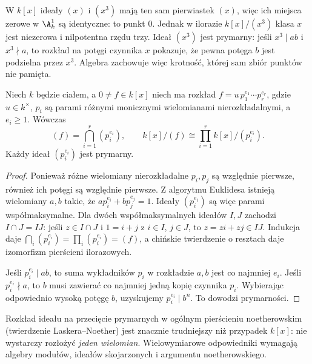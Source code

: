\begin{przyklad}
W $k[x]$ ideały $(x)$ i $(x^3)$ mają ten sam
pierwiastek $(x)$, więc ich miejsca zerowe
w $\A^1_k$ są identyczne: to punkt $0$.
Jednak w ilorazie $k[x]/(x^3)$ klasa $x$
jest niezerowa i nilpotentna rzędu trzy.
Ideał $(x^3)$ jest prymarny: jeśli $x^3\mid ab$
i $x^3\nmid a$, to rozkład na potęgi czynnika
$x$ pokazuje, że pewna potęga $b$ jest podzielna
przez $x^3$. Algebra zachowuje więc krotność,
której sam zbiór punktów nie pamięta.
\end{przyklad}

\begin{twierdzenie}
\label{tw:primary-kx}
Niech $k$ będzie ciałem, a $0\ne f\in k[x]$
niech ma rozkład
$f=u\,p_1^{e_1}\cdots p_r^{e_r}$,
gdzie $u\in k^\times$, $p_i$ są parami
różnymi monicznymi wielomianami nierozkładalnymi,
a $e_i\ge1$. Wówczas
\[
 (f)=\bigcap_{i=1}^r(p_i^{e_i}),\qquad
 k[x]/(f)\cong\prod_{i=1}^r k[x]/(p_i^{e_i}).
\]
Każdy ideał $(p_i^{e_i})$ jest prymarny.
\end{twierdzenie}
\begin{proof}
Ponieważ różne wielomiany nierozkładalne $p_i,p_j$
są względnie pierwsze, również ich potęgi są
względnie pierwsze. Z algorytmu Euklidesa
istnieją wielomiany $a,b$ takie, że
$ap_i^{e_i}+bp_j^{e_j}=1$.
Ideały $(p_i^{e_i})$ są więc parami współmaksymalne.
Dla dwóch współmaksymalnych ideałów $I,J$
zachodzi $I\cap J=IJ$: jeśli $z\in I\cap J$
i $1=i+j$ z $i\in I$, $j\in J$, to
$z=zi+zj\in IJ$. Indukcja daje
$\bigcap_i(p_i^{e_i})=\prod_i(p_i^{e_i})=(f)$,
a chińskie twierdzenie o resztach daje izomorfizm
pierścieni ilorazowych.

Jeśli $p_i^{e_i}\mid ab$, to suma wykładników
$p_i$ w rozkładzie $a,b$ jest co najmniej $e_i$.
Jeśli $p_i^{e_i}\nmid a$, to $b$ musi zawierać
co najmniej jedną kopię czynnika $p_i$.
Wybierając odpowiednio wysoką potęgę $b$,
uzyskujemy $p_i^{e_i}\mid b^n$.
To dowodzi prymarności.
\end{proof}

\begin{uwaga}
Rozkład ideału na przecięcie prymarnych w ogólnym
pierścieniu noetherowskim (twierdzenie Laskera--Noether)
jest znacznie trudniejszy niż przypadek $k[x]$:
nie wystarczy rozłożyć \emph{jeden wielomian}.
Wielowymiarowe odpowiedniki wymagają
algebry modułów, ideałów skojarzonych i argumentu
noetherowskiego.
\end{uwaga}

